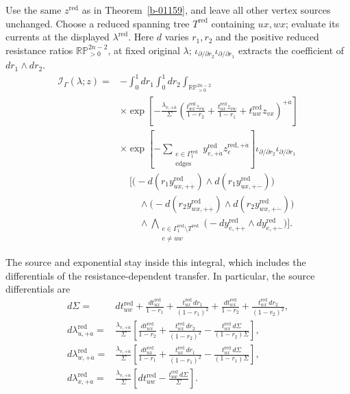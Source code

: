 \documentclass[11pt]{article}
\numberwithin{equation}{section}
\numberwithin{figure}{section}
\numberwithin{table}{section}
\begin{document}
Use the same $z^{\mathrm{red}}$ as in Theorem~\ref{b-01159}, and leave all other vertex sources unchanged. Choose a reduced spanning tree $T^{\mathrm{red}}$ containing $ux,wx$; evaluate its currents at the displayed $\lambda^{\mathrm{red}}$. Here $d$ varies $r_1,r_2$ and the positive reduced resistance ratios $\mathbb{RP}_{>0}^{2n-2}$, at fixed original $\lambda$; $\iota_{\partial/\partial r_2}\iota_{\partial/\partial r_1}$ extracts the coefficient of $dr_1\wedge dr_2$.
\begin{equation}\label{local-B-sourced-operator}
\begin{aligned}
\mathcal I_\Gamma(\lambda;z)
={}&-\int_0^1dr_1\int_0^1dr_2
\int_{\mathbb{RP}_{>0}^{2n-2}}\\
&\times\exp\!\left[-\frac{\lambda_{v,+\dot a}}{\Sigma}
\left(\frac{t_{wx}^{\mathrm{red}}z_{vu}}{1-r_2}
+\frac{t_{ux}^{\mathrm{red}}z_{vw}}{1-r_1}
+t_{uw}^{\mathrm{red}}z_{vx}\right)^{+\dot a}\right]\\
&\times\exp\!\left[-\sum_{\substack{e\in\Gamma_1^{\mathrm{red}}\\\mathrm{edges}}}
y_{e,+\dot a}^{\mathrm{red}}z_e^{\mathrm{red},+\dot a}\right]
\iota_{\partial/\partial r_2}\iota_{\partial/\partial r_1}\\
&\quad\Biggl[
\bigl(-d(r_1y_{ux,+\dot+}^{\mathrm{red}})
 \wedge d(r_1y_{ux,+\dot-}^{\mathrm{red}})\bigr)\\
&\qquad\wedge
\bigl(-d(r_2y_{wx,+\dot+}^{\mathrm{red}})
 \wedge d(r_2y_{wx,+\dot-}^{\mathrm{red}})\bigr)\\
&\qquad\wedge
\bigwedge_{\substack{e\in\Gamma_1^{\mathrm{red}}\setminus T^{\mathrm{red}}\\e\ne uw}}
\bigl(-dy_{e,+\dot+}^{\mathrm{red}}\wedge dy_{e,+\dot-}^{\mathrm{red}}\bigr)
\Biggr].
\end{aligned}
\end{equation}

The source and exponential stay inside this integral, which includes the differentials of the resistance-dependent transfer. In particular, the source differentials are
\begin{equation*}
\begin{aligned}
d\Sigma={}&dt_{uw}^{\mathrm{red}}
+\frac{dt_{ux}^{\mathrm{red}}}{1-r_1}
+\frac{t_{ux}^{\mathrm{red}}\,dr_1}{(1-r_1)^2}
+\frac{dt_{wx}^{\mathrm{red}}}{1-r_2}
+\frac{t_{wx}^{\mathrm{red}}\,dr_2}{(1-r_2)^2},\\
d\lambda_{u,+\dot a}^{\mathrm{red}}
={}&\frac{\lambda_{v,+\dot a}}{\Sigma}
\left[\frac{dt_{wx}^{\mathrm{red}}}{1-r_2}
+\frac{t_{wx}^{\mathrm{red}}\,dr_2}{(1-r_2)^2}
-\frac{t_{wx}^{\mathrm{red}}\,d\Sigma}{(1-r_2)\Sigma}\right],\\
d\lambda_{w,+\dot a}^{\mathrm{red}}
={}&\frac{\lambda_{v,+\dot a}}{\Sigma}
\left[\frac{dt_{ux}^{\mathrm{red}}}{1-r_1}
+\frac{t_{ux}^{\mathrm{red}}\,dr_1}{(1-r_1)^2}
-\frac{t_{ux}^{\mathrm{red}}\,d\Sigma}{(1-r_1)\Sigma}\right],\\
d\lambda_{x,+\dot a}^{\mathrm{red}}
={}&\frac{\lambda_{v,+\dot a}}{\Sigma}
\left[dt_{uw}^{\mathrm{red}}
-\frac{t_{uw}^{\mathrm{red}}\,d\Sigma}{\Sigma}\right].
\end{aligned}
\end{equation*}
\end{document}
